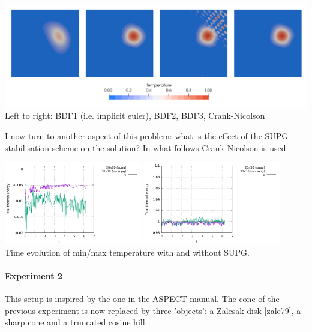 \begin{center}
\includegraphics[width=15cm]{python_codes/fieldstone_43/results/experiment1/Tbdf123crni.png}\\
{\captionfont Left to right: BDF1 (i.e. implicit euler), BDF2, BDF3, Crank-Nicolson}
\end{center}

I now turn to another aspect of this problem: what is the effect of the SUPG stabilisation 
scheme on the solution? In what follows Crank-Nicolson is used. 

\begin{center}
\includegraphics[width=6cm]{python_codes/fieldstone_43/results/experiment1/Tmin_supg}
\includegraphics[width=6cm]{python_codes/fieldstone_43/results/experiment1/Tmax_supg}\\
{\captionfont Time evolution of min/max temperature with and without SUPG.} 
\end{center}

\paragraph{Experiment 2}

This setup is inspired by the one in the ASPECT manual. The cone of the previous 
experiment is now replaced by three 'objects': a Zalesak disk \ref{zale79}, a sharp cone and a truncated cosine hill:

